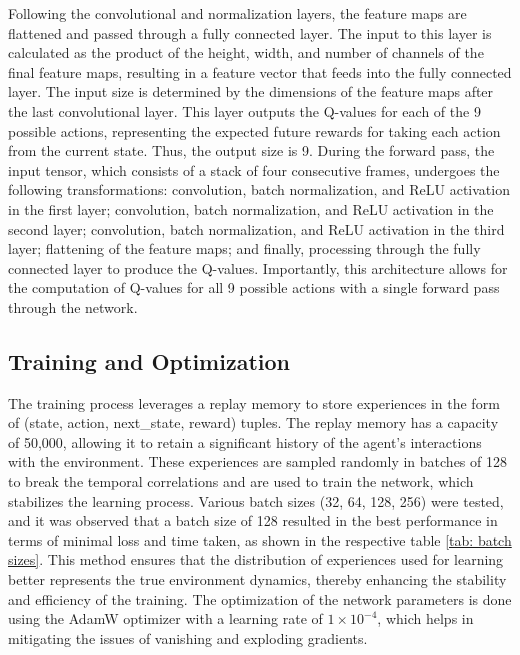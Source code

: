 \documentclass[twocolumn]{webofc}
\begin{document}
Following the convolutional and normalization layers, the feature maps are flattened and passed through a fully connected layer. The input to this layer is calculated as the product of the height, width, and number of channels of the final feature maps, resulting in a feature vector that feeds into the fully connected layer. The input size is determined by the dimensions of the feature maps after the last convolutional layer. This layer outputs the Q-values for each of the 9 possible actions, representing the expected future rewards for taking each action from the current state. Thus, the output size is 9. During the forward pass, the input tensor, which consists of a stack of four consecutive frames, undergoes the following transformations: convolution, batch normalization, and ReLU activation in the first layer; convolution, batch normalization, and ReLU activation in the second layer; convolution, batch normalization, and ReLU activation in the third layer; flattening of the feature maps; and finally, processing through the fully connected layer to produce the Q-values. Importantly, this architecture allows for the computation of Q-values for all 9 possible actions with a single forward pass through the network.


\subsection{Training and Optimization}
The training process leverages a replay memory to store experiences in the form of (state, action, next\_state, reward) tuples. The replay memory has a capacity of 50,000, allowing it to retain a significant history of the agent's interactions with the environment. These experiences are sampled randomly in batches of 128 to break the temporal correlations and are used to train the network, which stabilizes the learning process. Various batch sizes (32, 64, 128, 256) were tested, and it was observed that a batch size of 128 resulted in the best performance in terms of minimal loss and time taken, as shown in the respective table \ref{tab: batch sizes}. This method ensures that the distribution of experiences used for learning better represents the true environment dynamics, thereby enhancing the stability and efficiency of the training. The optimization of the network parameters is done using the AdamW optimizer with a learning rate of $1 \times 10^{-4}$, which helps in mitigating the issues of vanishing and exploding gradients.
\end{document}

